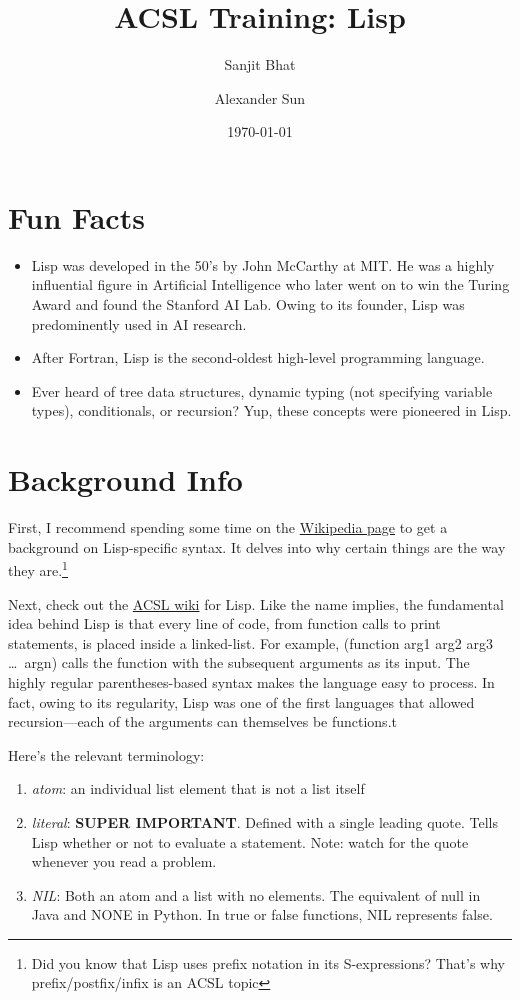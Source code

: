 \documentclass[11pt,letterpaper]{article}
\title{ACSL Training: Lisp}
\author{Sanjit Bhat \and Alexander Sun}
\date{\today}
\begin{document}
    \maketitle
    \section{Fun Facts}
    \begin{itemize}
        \item Lisp was developed in the 50's by John McCarthy at MIT.
        He was a highly influential figure in Artificial Intelligence who later
        went on to win the Turing Award and found the Stanford AI Lab.
        Owing to its founder, Lisp was predominently used in AI research.
        \item After Fortran, Lisp is the second-oldest high-level programming language.
        \item Ever heard of tree data structures, dynamic typing (not specifying variable types), conditionals, or recursion?
        Yup, these concepts were pioneered in Lisp.
    \end{itemize}

    \section{Background Info}
    First, I recommend spending some time on the
    \href{https://en.wikipedia.org/wiki/Lisp_(programming_language)#Syntax_and_semantics}{Wikipedia page} to get a background on Lisp-specific syntax.
    It delves into why certain things are the way they are.\footnote{Did
    you know that Lisp uses prefix notation in its S-expressions?
    That's why prefix/postfix/infix is an ACSL topic}

    Next, check out the \href{http://www.categories.acsl.org/wiki/index.php?title=LISP}{ACSL wiki} for Lisp.
    Like the name implies, the fundamental idea behind Lisp is that every
    line of code, from function calls to print statements,
    is placed inside a linked-list.
    For example, (function arg1 arg2 arg3 \ldots~argn)
    calls the function with the subsequent arguments as its input.
    The highly regular parentheses-based syntax makes the language
    easy to process.
    In fact, owing to its regularity, Lisp was one of the first languages
    that allowed recursion---each of the arguments can themselves
    be functions.t

    Here's the relevant terminology:
    \begin{enumerate}
        \item \textit{atom}: an individual list element that is not a list itself
        \item \textit{literal}: \textbf{SUPER IMPORTANT}.
        Defined with a single leading quote.
        Tells Lisp whether or not to evaluate a statement.
        Note: watch for the quote whenever you read a problem.
        \item \textit{NIL}: Both an atom and a list with no elements.
        The equivalent of null in Java and NONE in Python.
        In true or false functions, NIL represents false.
    \end{enumerate}
\end{document}
